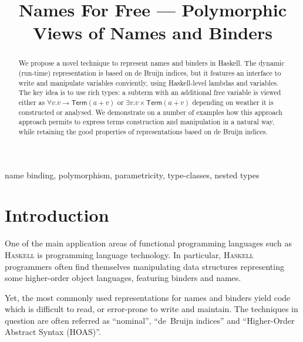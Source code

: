 \documentclass[9pt,preprint,authoryear]{sigplanconf}
\title{Names For Free --- Polymorphic Views of Names and Binders}
\begin{document}
\maketitle

\begin{abstract}
We propose a novel technique to represent names and binders in
Haskell. The dynamic (run-time) representation is based on de Bruijn
indices, but it features an interface to write and manipulate
variables conviently, using Haskell-level lambdas and variables. The
key idea is to use rich types: a subterm with an additional free variable
is viewed either as $\forall v. v \rightarrow \mathsf{Term} (a + v)$
or $\exists v. v \times \mathsf{Term} (a + v)$ depending on weather it
is constructed or analysed.  We demonstrate on a number of examples
how this approach approach permits to express terms construction and 
manipulation in a natural way, while retaining the good properties of
representations based on de Bruijn indices.

\end{abstract}


\begin{keywords}name binding,
polymorphism,
parametricity,
type-classes,
nested types\end{keywords}

\section{Introduction\label{intro}}

%
One of the main application areas of functional programming
    languages such as \textsc{Haskell} is programming language technology. In
    particular, \textsc{Haskell} programmers often find themselves manipulating
    data structures representing some higher-order object languages,
    featuring binders and names.%


%
Yet, the most commonly used representations for names and binders
    yield code which is difficult to read, or error-prone to write
    and maintain. The techniques in question are often referred as
    {``}nominal{''}, {``}de{~}Bruijn indices{''} and {``}Higher-Order Abstract
    Syntax (HOAS){''}.%
\end{document}

